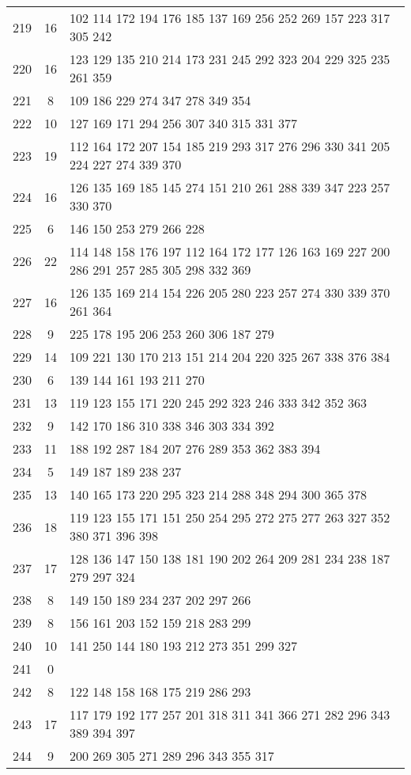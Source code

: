 \documentclass{standalone}
\begin{document}
\begin{tabular}{c c l}
219 & 16 & 102 114 172 194 176 185 137 169 256 252 269 157 223 317 305 242 \\
220 & 16 & 123 129 135 210 214 173 231 245 292 323 204 229 325 235 261 359 \\
221 & 8 & 109 186 229 274 347 278 349 354 \\
222 & 10 & 127 169 171 294 256 307 340 315 331 377 \\
223 & 19 & 112 164 172 207 154 185 219 293 317 276 296 330 341 205 224 227 274 339 370 \\
224 & 16 & 126 135 169 185 145 274 151 210 261 288 339 347 223 257 330 370 \\
225 & 6 & 146 150 253 279 266 228 \\
226 & 22 & 114 148 158 176 197 112 164 172 177 126 163 169 227 200 286 291 257 285 305 298 332 369 \\
227 & 16 & 126 135 169 214 154 226 205 280 223 257 274 330 339 370 261 364 \\
228 & 9 & 225 178 195 206 253 260 306 187 279 \\
229 & 14 & 109 221 130 170 213 151 214 204 220 325 267 338 376 384 \\
230 & 6 & 139 144 161 193 211 270 \\
231 & 13 & 119 123 155 171 220 245 292 323 246 333 342 352 363 \\
232 & 9 & 142 170 186 310 338 346 303 334 392 \\
233 & 11 & 188 192 287 184 207 276 289 353 362 383 394 \\
234 & 5 & 149 187 189 238 237 \\
235 & 13 & 140 165 173 220 295 323 214 288 348 294 300 365 378 \\
236 & 18 & 119 123 155 171 151 250 254 295 272 275 277 263 327 352 380 371 396 398 \\
237 & 17 & 128 136 147 150 138 181 190 202 264 209 281 234 238 187 279 297 324 \\
238 & 8 & 149 150 189 234 237 202 297 266 \\
239 & 8 & 156 161 203 152 159 218 283 299 \\
240 & 10 & 141 250 144 180 193 212 273 351 299 327 \\
241 & 0 &  \\
242 & 8 & 122 148 158 168 175 219 286 293 \\
243 & 17 & 117 179 192 177 257 201 318 311 341 366 271 282 296 343 389 394 397 \\
244 & 9 & 200 269 305 271 289 296 343 355 317 \\

\end{tabular}
\end{document}
